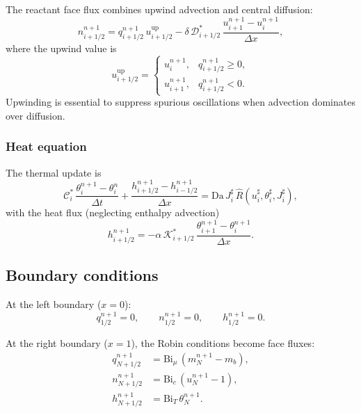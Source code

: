 \documentclass[aps,pre,reprint,superscriptaddress,longbibliography,floatfix]{revtex4-2}
\newcommand{\Ds}{\mathcal{D}}
\newcommand{\Cs}{\mathcal{C}}
\newcommand{\Ks}{\mathcal{K}}
\newcommand{\Da}{\mathrm{Da}}
\newcommand{\Bi}{\mathrm{Bi}}
\newcommand{\Rhat}{\widehat{R}}
\begin{document}
The reactant face flux combines upwind advection and central diffusion:
\begin{equation}
  n_{i+1/2}^{n+1}
  = q_{i+1/2}^{n+1}\,u_{i+1/2}^\mathrm{up}
  - \delta\,\Ds_{i+1/2}^{*}\,
  \frac{u_{i+1}^{n+1} - u_i^{n+1}}{\Delta x},
  \label{eq:disc_n}
\end{equation}
where the upwind value is
\begin{equation}
  u_{i+1/2}^\mathrm{up}
  = \begin{cases}
    u_i^{n+1}, & q_{i+1/2}^{n+1} \ge 0, \\[4pt]
    u_{i+1}^{n+1}, & q_{i+1/2}^{n+1} < 0.
  \end{cases}
  \label{eq:upwind}
\end{equation}
Upwinding is essential to suppress spurious oscillations when advection dominates over diffusion.

\subsubsection{Heat equation}

The thermal update is
\begin{equation}
  \Cs_i^{*}\,\frac{\theta_i^{n+1} - \theta_i^{n}}{\Delta t}
  + \frac{h_{i+1/2}^{n+1} - h_{i-1/2}^{n+1}}{\Delta x}
  = \Da\,J_i^{\sharp}\,\Rhat(u_i^{\sharp},\theta_i^{\sharp},J_i^{\sharp}),
  \label{eq:disc_theta}
\end{equation}
with the heat flux (neglecting enthalpy advection)
\begin{equation}
  h_{i+1/2}^{n+1}
  = -\alpha\,\Ks_{i+1/2}^{*}\,
  \frac{\theta_{i+1}^{n+1} - \theta_i^{n+1}}{\Delta x}.
  \label{eq:disc_h}
\end{equation}

\subsection{Boundary conditions}

At the left boundary ($x=0$):
\begin{equation}
  q_{1/2}^{n+1} = 0,
  \qquad
  n_{1/2}^{n+1} = 0,
  \qquad
  h_{1/2}^{n+1} = 0.
  \label{eq:disc_bc0}
\end{equation}

At the right boundary ($x=1$), the Robin conditions become face fluxes:
\begin{align}
  q_{N+1/2}^{n+1} &= \Bi_\mu\,(m_N^{n+1} - m_b), \label{eq:disc_bc1_q} \\
  n_{N+1/2}^{n+1} &= \Bi_c\,(u_N^{n+1} - 1), \label{eq:disc_bc1_n} \\
  h_{N+1/2}^{n+1} &= \Bi_T\,\theta_N^{n+1}. \label{eq:disc_bc1_h}
\end{align}
\end{document}
